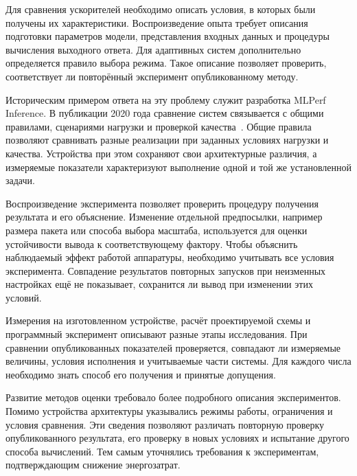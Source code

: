 Для сравнения ускорителей необходимо описать условия, в которых были получены
их характеристики. Воспроизведение опыта требует
описания подготовки параметров модели, представления входных данных
и процедуры вычисления выходного ответа. Для адаптивных систем
дополнительно определяется правило выбора режима. Такое описание позволяет проверить, соответствует ли повторённый эксперимент
опубликованному методу.

Историческим примером ответа на эту проблему служит разработка
MLPerf Inference. В публикации 2020 года сравнение систем
связывается с общими правилами, сценариями нагрузки
и проверкой качества~\cite{mlperf2020}. Общие правила позволяют сравнивать разные реализации при заданных условиях
нагрузки и качества. Устройства при этом сохраняют свои архитектурные
различия, а измеряемые показатели характеризуют выполнение одной и той же
установленной задачи.

Воспроизведение эксперимента позволяет проверить процедуру
получения результата и его объяснение. Изменение отдельной
предпосылки, например размера пакета или способа выбора
масштаба, используется для оценки устойчивости вывода
к соответствующему фактору. Чтобы объяснить наблюдаемый эффект работой аппаратуры, необходимо учитывать
все условия эксперимента. Совпадение результатов повторных запусков при
неизменных настройках ещё не показывает, сохранится ли вывод при изменении
этих условий.

\begin{samepage}
Измерения на изготовленном устройстве, расчёт проектируемой схемы и
программный эксперимент описывают разные этапы исследования. При сравнении
опубликованных показателей проверяется, совпадают ли измеряемые величины,
условия исполнения и учитываемые части системы. Для каждого числа необходимо
знать способ его получения и принятые допущения.
\par\nopagebreak[4]

Развитие методов оценки требовало более подробного описания экспериментов.
Помимо устройства архитектуры указывались режимы работы, ограничения и условия
сравнения. Эти сведения позволяют различать повторную проверку опубликованного
результата, его проверку в новых условиях и испытание другого способа
вычислений. Тем самым уточнялись требования к экспериментам, подтверждающим
снижение энергозатрат.
\par
\end{samepage}
